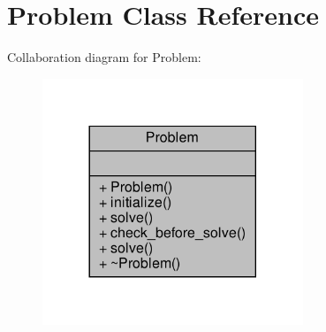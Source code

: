 \hypertarget{classProblem}{}\section{Problem Class Reference}
\label{classProblem}


Collaboration diagram for Problem\+:\nopagebreak
\begin{figure}[H]
\begin{center}
\leavevmode
\includegraphics[width=221pt]{classProblem__coll__graph}
\end{center}
\end{figure}
